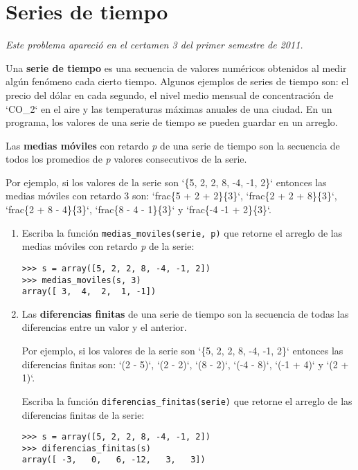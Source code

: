 \section{Series de tiempo}

\emph{Este problema apareció en el certamen 3 del primer semestre de
2011.}

Una \textbf{serie de tiempo} es una secuencia de valores numéricos
obtenidos al medir algún fenómeno cada cierto tiempo. Algunos ejemplos
de series de tiempo son: el precio del dólar en cada segundo, el nivel
medio mensual de concentración de `CO\_2` en el aire y las temperaturas
máximas anuales de una ciudad. En un programa, los valores de una serie
de tiempo se pueden guardar en un arreglo.

Las \textbf{medias móviles} con retardo \emph{p} de una serie de tiempo
son la secuencia de todos los promedios de \emph{p} valores consecutivos
de la serie.

Por ejemplo, si los valores de la serie son `\{5, 2, 2, 8, -4, -1, 2\}`
entonces las medias móviles con retardo 3 son: `frac\{5 + 2 + 2\}\{3\}`,
`frac\{2 + 2 + 8\}\{3\}`, `frac\{2 + 8 - 4\}\{3\}`, `frac\{8 - 4 -
1\}\{3\}` y `frac\{-4 -1 + 2\}\{3\}`.

\begin{enumerate}
\item
  Escriba la función \lstinline!medias_moviles(serie, p)! que retorne el
  arreglo de las medias móviles con retardo \emph{p} de la serie:

\begin{lstlisting}
>>> s = array([5, 2, 2, 8, -4, -1, 2])
>>> medias_moviles(s, 3)
array([ 3,  4,  2,  1, -1])
\end{lstlisting}
\item
  Las \textbf{diferencias finitas} de una serie de tiempo son la
  secuencia de todas las diferencias entre un valor y el anterior.

  Por ejemplo, si los valores de la serie son `\{5, 2, 2, 8, -4, -1,
  2\}` entonces las diferencias finitas son: `(2 - 5)`, `(2 - 2)`, `(8 -
  2)`, `(-4 - 8)`, `(-1 + 4)` y `(2 + 1)`.

  Escriba la función \lstinline!diferencias_finitas(serie)! que retorne
  el arreglo de las diferencias finitas de la serie:

\begin{lstlisting}
>>> s = array([5, 2, 2, 8, -4, -1, 2])
>>> diferencias_finitas(s)
array([ -3,   0,   6, -12,   3,   3])
\end{lstlisting}
\end{enumerate}
